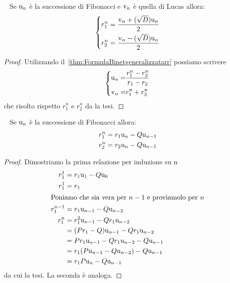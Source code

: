 \begin{thm}~\cite{Rabinowitz_1996}\label{thm:FibLucRimuovirr}
	Se $\mathrm{u}_{n}$ è la successione di Fibonacci e  $\mathrm{v}_{n}$ è quella di Lucas
	allora:\begin{equation}
		\left\{\begin{aligned}
			r_1^n={} & \dfrac{\mathrm{v}_{n}+(\sqrt{D})\mathrm{u}_{n}}{2} \\
			r_2^n={} & \dfrac{\mathrm{v}_{n}-(\sqrt{D})\mathrm{u}_{n}}{2} \\
		\end{aligned}
		\right.
	\end{equation}
\end{thm}
\begin{proof}
	Utilizzando il~\vref{thm:FormulaBinetgeneralizzatarr}
	possiamo scrivere
	\begin{equation*}
		\left\{
		\begin{aligned}
			\mathrm{u}_{n}= & \dfrac{r_{1}^n-r_{2}^n}{r_{1}-r_{2}} \\
			\mathrm{v}_{n}= & r_{1}^n+r_{2}^n
		\end{aligned}
		\right.
	\end{equation*}
	che risolto rispetto $r_1^n$ e $r_2^n$ da la tesi.
\end{proof}
\begin{thm}~\cite{Rabinowitz_1996}\label{thm:FibLucRimuovirrpotenze}
	Se $\mathrm{u}_{n}$ è la successione di Fibonacci
	allora:
	\begin{align}
		r_1^n={} & r_1\mathrm{u}_{n}-Q\mathrm{u}_{n-1} \\
		r_2^n={} & r_2\mathrm{u}_{n}-Q\mathrm{u}_{n-1} \\
	\end{align}
\end{thm}
\begin{proof}
	Dimostriamo la prima relazione per induzione su n
	\begin{align*}
		r_1^1={}     & r_1\mathrm{u}_{1}-Q\mathrm{u}_{0}                   \\
		r_1^1={}     & r_1                                 \\
		\intertext{Poniamo che sia vera per $n-1$ e proviamolo per $n$}
		r_1^{n-1}={} & r_1\mathrm{u}_{n-1}-Q\mathrm{u}_{n-2}               \\
		r_1^{n}={}   & r_1^2\mathrm{u}_{n-1}-Qr_1\mathrm{u}_{n-2}          \\
		={}          & (Pr_1-Q)\mathrm{u}_{n-1}-Qr_1\mathrm{u}_{n-2}       \\
		={}          & Pr_1\mathrm{u}_{n-1}-Qr_1\mathrm{u}_{n-2}-Q\mathrm{u}_{n-1} \\
		={}          & r_1(P\mathrm{u}_{n-1}-Q\mathrm{u}_{n-2})-Q\mathrm{u}_{n-1}  \\
		={}          & r_1P\mathrm{u}_{n}-Q\mathrm{u}_{n-1}                \\
	\end{align*}
	da cui la tesi. La seconda è analoga.
\end{proof}
